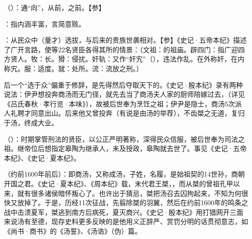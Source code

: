 {
\item {}（）：通“向”，从前，之前。【参】
\item {}：指内涵丰富，言简意赅。
\item {}：从民众中（量才）选拔，与后来的贵族世袭相对。【参】《史记·五帝本纪》描述了广开言路，使等22名贤臣各得其所的情景：（文祖：的祖庙。辟四门：指广迎四方贤人。牧：长。猾：侵扰。奸轨：又作“奸宄”（），违法作乱。在外称奸，在内称宄。服：适度。就：处所。流：流放之刑。）

后一个“选于众”偏重于修辞，是先得然后夺取天下的。《史记·殷本纪》录有两种说法：伊尹想投奔商汤而无门径，就先去当了商汤夫人家的厨师陪嫁过去，（详见《吕氏春秋·孝行览·本味》），故被后世奉为烹饪之祖；伊尹是隐士，商汤5次派人礼聘才同意出山。后来他又曾投奔（有说是由汤的举荐），不齿桀之无道，复归于汤，终成大业。%

\item {}（）：时期掌管刑法的贤臣，以公正严明著称，深得民众信服，被后世奉为司法之祖。继帝位后想指定皋陶为继承人，未及授政，皋陶就去世了。事见《史记·五帝本纪》、《史记·夏本纪》。%

\item {}（约前1600年前后）：即商汤，又称成汤，子姓，名履，是始祖契的14世孙，商朝开国之君。《史记·夏本纪》、《周本纪》载，末代君王桀，，而从桀的曾祖孔甲以来，就有很多诸侯暗怀叛心了。也许出于猜忌，桀把汤召去囚拘起来，不知为何很快又放掉了。于是，历经11次征战，先翦除桀的羽翼，然后在约前1600年的鸣条之战中击溃夏军，桀逃到南方后病死，夏灭商兴。《史记·殷本纪》用打猎网开三面来说汤有至德，现存史料更多反映的是他用义正辞严、赏罚分明的话贯彻意志，如《尚书·商书》的《汤誓》、《汤诰》（伪）篇。

}
